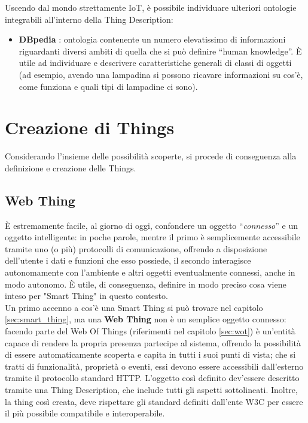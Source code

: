 \documentclass[12pt,a4paper,openright,oneside]{report}
\newcommand{\quotes}[1]{``#1''}
\begin{document}
Uscendo dal mondo strettamente IoT, è possibile individuare ulteriori ontologie integrabili all'interno della Thing Description:
\begin{itemize}
	\item \textbf{DBpedia} \cite{dbpedia}: ontologia contenente un numero elevatissimo di informazioni riguardanti diversi ambiti di quella che si può definire \quotes{human knowledge}. È utile ad individuare e descrivere caratteristiche generali di classi di oggetti (ad esempio, avendo una lampadina si possono ricavare informazioni su cos'è, come funziona e quali tipi di lampadine ci sono).
\end{itemize}




\clearpage{\pagestyle{empty}\cleardoublepage}
\chapter{Creazione di Things}           %
\lhead[\fancyplain{}{\bfseries\thepage}]{\fancyplain{}{\bfseries\rightmark}}  

Considerando l'insieme delle possibilità scoperte, si procede di conseguenza alla definizione e creazione delle Things.

\section{Web Thing}
È estremamente facile, al giorno di oggi, confondere un oggetto \quotes{\textit{connesso}} e un oggetto intelligente: in poche parole, mentre il primo è semplicemente accessibile tramite uno (o più) protocolli di comunicazione, offrendo a disposizione dell'utente i dati e funzioni che esso possiede, il secondo interagisce autonomamente con l'ambiente e altri oggetti eventualmente connessi, anche in modo autonomo. È utile, di conseguenza, definire in modo preciso cosa viene inteso per "Smart Thing" in questo contesto.\\

Un primo accenno a cos'è una Smart Thing si può trovare nel capitolo \ref{sec:smart_thing}, ma una \textbf{Web Thing} non è un semplice oggetto connesso: facendo parte del Web Of Things (riferimenti nel capitolo \ref{sec:wot}) è un'entità capace di rendere la propria presenza partecipe al sistema, offrendo la possibilità di essere automaticamente scoperta e capita in tutti i suoi punti di vista; che si tratti di funzionalità, proprietà o eventi, essi devono essere accessibili dall'esterno tramite il protocollo standard HTTP. L'oggetto così definito \mbox{dev'essere} descritto tramite una Thing Description, che include tutti gli aspetti sottolineati. Inoltre, la thing così creata, deve rispettare gli standard definiti dall'ente W3C per essere il più possibile compatibile e interoperabile.\\
\end{document}
